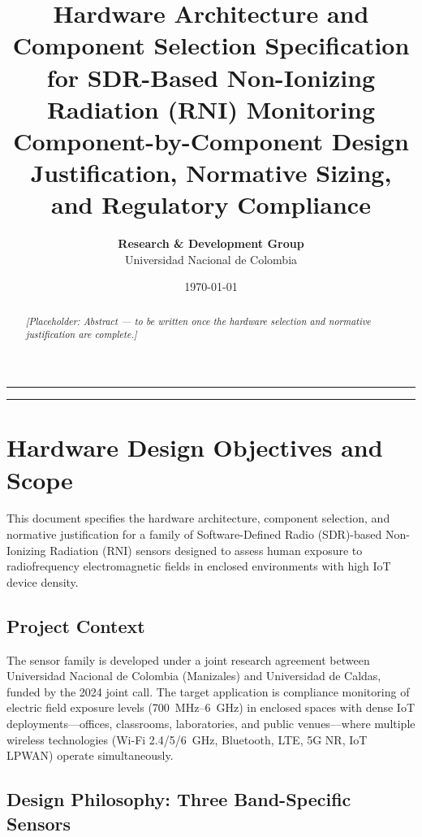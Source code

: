 \documentclass[11pt,a4paper]{article}
\title{\textbf{\LARGE\color{primary} Hardware Architecture and Component Selection Specification \\ for SDR-Based Non-Ionizing Radiation (RNI) Monitoring} \\[0.5em]
\large\color{secondary} Component-by-Component Design Justification, Normative Sizing, and Regulatory Compliance}
\author{\textbf{Research \& Development Group} \\
Universidad Nacional de Colombia}
\date{\today}
\begin{document}
\maketitle
\thispagestyle{plain}

\begin{abstract}
\noindent \textit{[Placeholder: Abstract --- to be written once the hardware selection and normative justification are complete.]}
\end{abstract}

\vspace{1em}
\hrule
\vspace{1em}

\tableofcontents
\vspace{1.5em}
\hrule
\newpage

\section{Hardware Design Objectives and Scope}
\label{sec:design_objectives}

This document specifies the hardware architecture, component selection, and normative justification for a family of Software-Defined Radio (SDR)-based Non-Ionizing Radiation (RNI) sensors designed to assess human exposure to radiofrequency electromagnetic fields in enclosed environments with high IoT device density.

\subsection{Project Context}

The sensor family is developed under a joint research agreement between Universidad Nacional de Colombia (Manizales) and Universidad de Caldas, funded by the 2024 joint call. The target application is compliance monitoring of electric field exposure levels (700~MHz--6~GHz) in enclosed spaces with dense IoT deployments---offices, classrooms, laboratories, and public venues---where multiple wireless technologies (Wi-Fi 2.4/5/6~GHz, Bluetooth, LTE, 5G NR, IoT LPWAN) operate simultaneously.

\subsection{Design Philosophy: Three Band-Specific Sensors}
\end{document}
